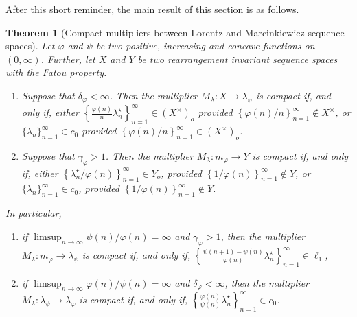 \documentclass[11pt]{amsart}
\theoremstyle{definition}
\newtheorem{theorem}{Theorem}[section]
\theoremstyle{definition}
\theoremstyle{definition}
\theoremstyle{definition}
\theoremstyle{definition}
\theoremstyle{definition}
\theoremstyle{definition}
\theoremstyle{definition}
\numberwithin{equation}{section}
\numberwithin{equation}{section}
\numberwithin{equation}{section}
\theoremstyle{definition}
\theoremstyle{definition}
\theoremstyle{definition}
\theoremstyle{definition}
\theoremstyle{definition}
\theoremstyle{definition}
\begin{document}
	After this short reminder, the main result of this section is as follows.
	
	\begin{theorem}[Compact multipliers between Lorentz and Marcinkiewicz sequence spaces] \label{Prop: computing multipliers from m and to lambda}
		{\it Let $\varphi$ and $\psi$ be two positive, increasing and concave functions on $(0,\infty)$.
			Further, let $X$ and $Y$  be two rearrangement invariant sequence spaces with the Fatou property.}
		\begin{enumerate}
			\item {\it Suppose that $\delta_{\varphi} < \infty$. Then the multiplier
				$M_{\lambda} \colon X \rightarrow \lambda_{\varphi}$ is compact if, and only if,
				either $\left\{ \frac{\varphi(n)}{n}\lambda_n^{\star} \right\}_{n=1}^{\infty} \in \left(X^{\times}\right)_o$ provided
				$\left\{ \varphi(n) / n \right\}_{n=1}^{\infty} \notin X^{\times}$, or $\{\lambda_n\}_{n=1}^{\infty} \in c_0$
				provided $\left\{ \varphi(n) / n \right\}_{n=1}^{\infty} \in \left( X^{\times} \right)_o$.}
			\item {\it Suppose that $\gamma_{\varphi} > 1$. Then the multiplier
				$M_{\lambda} \colon m_{\varphi} \rightarrow Y$ is compact if, and only if, either
				$\left\{ \lambda_n^{\star} / \varphi(n) \right\}_{n=1}^{\infty} \in Y_o$, provided
				$\left\{ 1 / \varphi(n) \right\}_{n=1}^{\infty} \notin Y$, or $\{\lambda_n\}_{n=1}^{\infty} \in c_0$,
				provided $\left\{ 1 / \varphi(n) \right\}_{n=1}^{\infty} \notin Y$.}
			
		\end{enumerate}
		{\it In particular,}
		\begin{enumerate}
			\item[(iii)] {\it if $\limsup_{n \rightarrow \infty} \psi(n) / \varphi(n) = \infty$
				and $\gamma_{\varphi} > 1$, then the multiplier $M_{\lambda} \colon m_{\varphi} \rightarrow \lambda_{\psi}$
				is compact if, and only if, $\left\{ \frac{\psi(n+1) - \psi(n)}{\varphi(n)} \lambda_n^{\star} \right\}_{n=1}^{\infty} \in \ell_1$,}
			\item[(iv)] {\it if $\limsup_{n \rightarrow \infty} \varphi(n) / \psi(n) = \infty$ and $\delta_{\varphi} < \infty$,
				then the multiplier $M_{\lambda} \colon \lambda_{\psi} \rightarrow \lambda_{\varphi}$
				is compact if, and only if, $\left\{ \frac{\varphi(n)}{\psi(n)} \lambda_n^{\star} \right\}_{n=1}^{\infty} \in c_0$.}
		\end{enumerate}
	\end{theorem}
\end{document}
